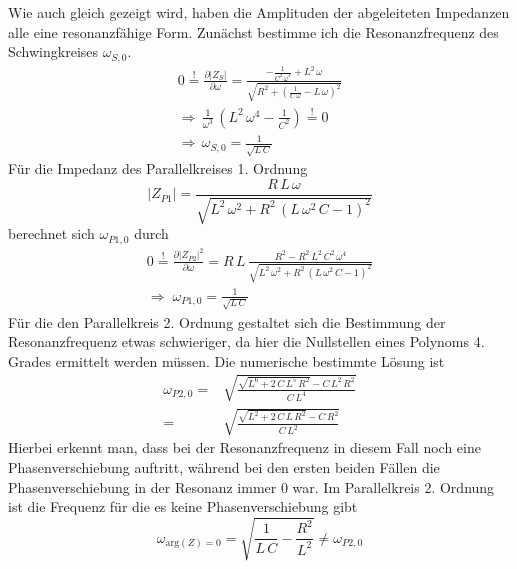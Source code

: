 \documentclass[a4paper, 12pt,]{scrartcl}
\begin{document}
Wie auch gleich gezeigt wird, haben die Amplituden der abgeleiteten Impedanzen alle eine resonanzfähige Form. Zunächst bestimme ich die Resonanzfrequenz des Schwingkreises $\omega_{S,0}$.
\begin{align*}0\overset{!}{=}\frac{\partial{|Z_S|}}{\partial\omega}=\frac{-\frac{1}{C^2\,\omega^3}+L^2\,\omega}{\sqrt{R^2+\left(\frac{1}{C\,\omega}-L\,\omega\right)^2}}\\
\Rightarrow\,\frac{1}{\omega^3}\,(L^2\,\omega^4-\frac{1}{C^2})\overset{!}{=}0\\
\Rightarrow\,\omega_{S,0}=\frac{1}{\sqrt{L\,C}}\end{align*}
Für die Impedanz des Parallelkreises 1. Ordnung 
\begin{equation*}|Z_{P1}|=\frac{R\,L\,\omega}{\sqrt{L^2\,\omega^2+R^2\,(L\,\omega^2\,C-1)^2}}\end{equation*}
berechnet sich $\omega_{P1,0}$ durch
\begin{align*}0\overset{!}{=}\frac{\partial{|Z_{P2}|^2}}{\partial\omega}=R\,L\,\frac{R^2-R^2\,L^2\,C^2\,\omega^4}{\sqrt{L^2\,\omega^2+R^2\,(L\,\omega^2\,C-1)^2}}\\
\Rightarrow\;\omega_{P1,0}=\frac{1}{\sqrt{L\,C}}\end{align*}
Für die den Parallelkreis 2. Ordnung gestaltet sich die Bestimmung der Resonanzfrequenz etwas schwieriger, da hier die Nullstellen eines Polynoms 4. Grades ermittelt werden müssen. Die numerische bestimmte Lösung ist
\begin{align*}\omega_{P2,0}=&\sqrt{\frac{\sqrt{L^6+2\,C\,L^5\,R^2}-C\,L^2\,R^2}{C\,L^4}}\\
=&\sqrt{\frac{\sqrt{L^2+2\,C\,L\,R^2}-C\,R^2}{C\,L^2}}\end{align*}
Hierbei erkennt man, dass bei der Resonanzfrequenz in diesem Fall noch eine Phasenverschiebung auftritt, während bei den ersten beiden Fällen die Phasenverschiebung in der Resonanz immer 0 war. Im Parallelkreis 2. Ordnung ist die Frequenz für die es keine Phasenverschiebung gibt
\begin{equation*}\omega_{\text{arg}(Z)=0}=\sqrt{\frac{1}{L\,C}-\frac{R^2}{L^2}}\neq\omega_{P2,0}\end{equation*}
\end{document}
